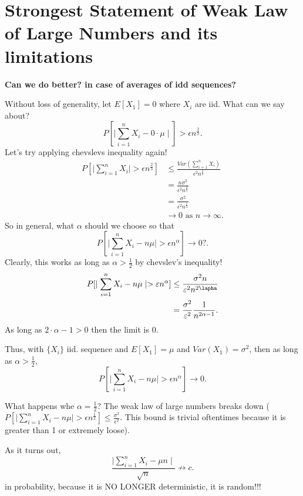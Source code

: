 \documentclass[a4paper]{article}
\begin{document}
\section{Strongest Statement of Weak Law of Large Numbers and its limitations}
\textbf{Can we do better? in case of averages of idd sequences?}

Without loss of generality, let $E[X_1] = 0$ where  $X_i$ are iid. What can we say about?
 \[
   P[\mid \sum_{i=1}^{n} X_i - 0 \cdot \mu \mid]  > \epsilon n^{\frac{2}{3}} 
.\] 
Let's try applying chevslevs inequality again!
\begin{align*}
  P[ \mid \sum_{i=1}^{n} X_i \mid  > \epsilon n^{\frac{2}{3}} ] &\leq \frac{Var(\sum_{i=1}^{n}X_i) }{\epsilon^{2} n^{\frac{2}{3}}} \\
                                                                &=\frac{n \sigma^{2}}{\epsilon^{2} n^{\frac{4}{3}}} \\
                                                                &= \frac{\sigma^{2}}{\epsilon^{2} n^{\frac{1}{3}}} \\
                                                                &\to 0 \text{ as $n \to \infty$}
.\end{align*}
So in general, what $\alpha$ should we choose so that 
\[
  P[\mid \sum_{i=1}^{n} X_i - n \mu \mid > \epsilon n^{\alpha}] \to 0? 
.\] 
Clearly, this works as long as  $\alpha > \frac{1}{2}$ by chevslev's inequality!
\begin{align*}
  P[\mid \sum_{i=1}^{n} X_i - n \mu \mid > \epsilon n^{\alpha}] &\leq \frac{\sigma^{2} n}{\epsilon^{2} n^{2\lapha}}\\
                                                                &= \frac{\sigma^{2}}{\epsilon^{2}} \frac{1}{n^{2 \alpha - 1}}
.\end{align*}
As long as $2 \cdot \alpha -1 > 0$ then the limit is  $0$.
\begin{definition}
  Thus, with $\{X_i\} $ iid. sequence and $E[X_1] = \mu$ and  $Var(X_1) = \sigma^{2}$, then as long as $\alpha > \frac{1}{2}$,
\[
  P[\mid \sum_{i=1}^{n} X_i - n \mu \mid > \epsilon n^{\alpha}] \to 0 
.\] 
\end{definition}

\begin{remark}
  What happens whe $\alpha = \frac{1}{2}$? The weak law of large numbers breaks  down ($ P[\mid \sum_{i=1}^{n} X_i - n \mu \mid > \epsilon n^{\frac{1}{2}}] \leq \frac{\sigma^{2}}{\epsilon^{2}}$. This bound is trivial oftentimes because it is greater than 1 or extremely loose).

As it turns out,
\[
\frac{\mid  \sum_{i=1}^{n} X_i - \mu n\mid }{\sqrt{n}} \not\to c 
.\] in probability, because it is NO LONGER deterministic, it is random!!!

\end{remark}
\end{document}
